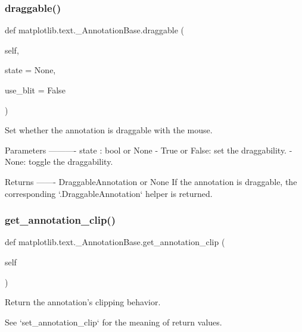 \subsubsection{\texorpdfstring{draggable()}{draggable()}}
{\footnotesize\ttfamily def matplotlib.\+text.\+\_\+\+Annotation\+Base.\+draggable (\begin{DoxyParamCaption}\item[{}]{self,  }\item[{}]{state = {\ttfamily None},  }\item[{}]{use\+\_\+blit = {\ttfamily False} }\end{DoxyParamCaption})}

\begin{DoxyVerb}Set whether the annotation is draggable with the mouse.

Parameters
----------
state : bool or None
    - True or False: set the draggability.
    - None: toggle the draggability.

Returns
-------
DraggableAnnotation or None
    If the annotation is draggable, the corresponding
    `.DraggableAnnotation` helper is returned.
\end{DoxyVerb}
 \mbox{\label{classmatplotlib_1_1text_1_1__AnnotationBase_a1a3832aa3aa7251d398bb7688d47741f}} 
\subsubsection{\texorpdfstring{get\+\_\+annotation\+\_\+clip()}{get\_annotation\_clip()}}
{\footnotesize\ttfamily def matplotlib.\+text.\+\_\+\+Annotation\+Base.\+get\+\_\+annotation\+\_\+clip (\begin{DoxyParamCaption}\item[{}]{self }\end{DoxyParamCaption})}

\begin{DoxyVerb}Return the annotation's clipping behavior.

See `set_annotation_clip` for the meaning of return values.
\end{DoxyVerb}
 \mbox{\label{classmatplotlib_1_1text_1_1__AnnotationBase_a3fb832febdfbaf0f6c30382765374e15}} 
